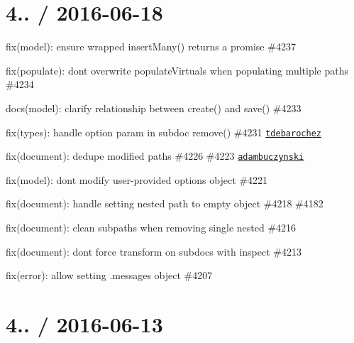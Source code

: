 \section*{4.. / 2016-\/06-\/18 }


\begin{DoxyItemize}
\item fix(model)\+: ensure wrapped insert\+Many() returns a promise \#4237
\item fix(populate)\+: dont overwrite populate\+Virtuals when populating multiple paths \#4234
\item docs(model)\+: clarify relationship between create() and save() \#4233
\item fix(types)\+: handle option param in subdoc remove() \#4231 \href{https://github.com/tdebarochez}{\tt tdebarochez}
\item fix(document)\+: dedupe modified paths \#4226 \#4223 \href{https://github.com/adambuczynski}{\tt adambuczynski}
\item fix(model)\+: don\textquotesingle{}t modify user-\/provided options object \#4221
\item fix(document)\+: handle setting nested path to empty object \#4218 \#4182
\item fix(document)\+: clean subpaths when removing single nested \#4216
\item fix(document)\+: don\textquotesingle{}t force transform on subdocs with inspect \#4213
\item fix(error)\+: allow setting .messages object \#4207
\end{DoxyItemize}

\section*{4.. / 2016-\/06-\/13 }


